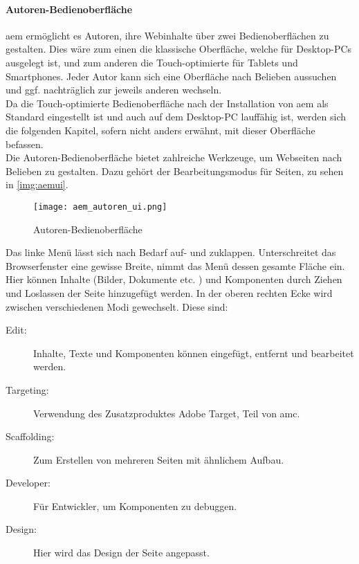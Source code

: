 \paragraph{Autoren-Bedienoberfläche}
\label{sec:autor_ui}
\ac{aem} ermöglicht es Autoren, ihre Webinhalte über zwei Bedienoberflächen zu gestalten. Dies wäre zum einen die klassische Oberfläche, welche für Desktop-PCs ausgelegt ist, und zum anderen die Touch-optimierte für Tablets und Smartphones. Jeder Autor kann sich eine Oberfläche nach Belieben aussuchen und ggf. nachträglich zur jeweils anderen wechseln.\\
Da die Touch-optimierte Bedienoberfläche nach der Installation von \ac{aem} als Standard eingestellt ist und auch auf dem Desktop-PC lauffähig ist, werden sich die folgenden Kapitel, sofern nicht anders erwähnt, mit dieser Oberfläche befassen. \\
Die Autoren-Bedienoberfläche bietet zahlreiche Werkzeuge, um Webseiten nach Belieben zu gestalten. Dazu gehört der Bearbeitungsmodus für Seiten, zu sehen in \autoref{img:aemui}.

\begin{figure}[H]
	\begin{center}
      	\texttt{[image: aem\_autoren\_ui.png]}
		\caption{Autoren-Bedienoberfläche}
		\label{img:aemui}
	\end{center}
\end{figure}

Das linke Menü lässt sich nach Bedarf auf- und zuklappen. Unterschreitet das Browserfenster eine gewisse Breite, nimmt das Menü dessen gesamte Fläche ein. Hier können Inhalte (Bilder, Dokumente etc. ) und Komponenten durch Ziehen und Loslassen der Seite hinzugefügt werden. In der oberen rechten Ecke wird zwischen verschiedenen Modi gewechselt. Diese sind:

\begin{description}
	\item[Edit:] Inhalte, Texte und Komponenten können eingefügt, entfernt und bearbeitet werden.
	\item[Targeting:] Verwendung des Zusatzproduktes Adobe Target, Teil von \ac{amc}.
	\item[Scaffolding:] Zum Erstellen von mehreren Seiten mit ähnlichem Aufbau.
	\item[Developer:] Für Entwickler, um Komponenten zu debuggen.
	\item[Design:] Hier wird das Design der Seite angepasst.
\end{description}
